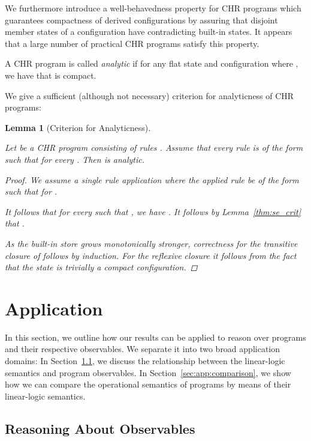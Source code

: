 \documentclass[acmtocl]{acmtrans2m}
\newtheorem{lemma}[theorem]{Lemma}
\begin{document}
We furthermore introduce a well-behavedness property for CHR programs
which guarantees compactness of derived configurations by assuring that
disjoint member states of a configuration have contradicting built-in states. It
appears that a large number of practical CHR programs satisfy this property.

\begin{definition}
\label{def:analytic}
A CHR program is called \emph{analytic} if for any flat state 
and configuration  where , we have that  is compact.
\end{definition}

We give a sufficient (although not necessary) criterion for analyticness
of CHR programs:

\begin{lemma}[Criterion for Analyticness]
\label{lemma:vee-analytic-criterion}

Let  be a CHR program consisting of rules . Assume
that every rule  is of the form  such that
 for every . Then 
is analytic.

\begin{proof} We assume a single rule application  where the
applied rule be of the form  such that
 for .

It follows that for every
 such that , we have . It
follows by Lemma~\ref{thm:se_crit} that .

As the built-in store grows monotonically stronger, correctness for the
transitive closure of  follows by induction. For the reflexive closure
it follows from the fact that the state  is trivially a compact
configuration.
\end{proof}
\end{lemma}

\section{Application}
\label{sec:application}

In this section, we outline how our results can be applied to reason over
programs and their respective observables. We separate it into two broad
application domains: In Section~\ref{sec:app:observables}, we discuss the
relationship between the linear-logic semantics and program observables. In
Section~\ref{sec:app:comparison}, we show how we can compare the operational
semantics of programs by means of their linear-logic semantics.

\subsection{Reasoning About Observables}
\label{sec:app:observables}
\end{document}

